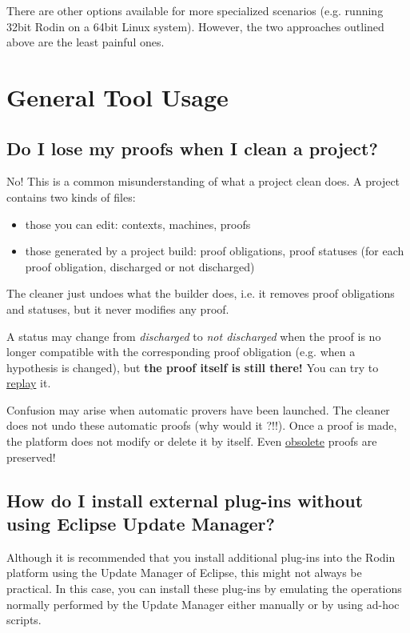 There are other options available for more specialized scenarios (e.g. running 32bit Rodin on a 64bit Linux system).  However, the two approaches outlined above are the least painful ones.

\section{General Tool Usage}

\subsection{Do I lose my proofs when I clean a project?}
No! This is a common misunderstanding of what a project clean does. A project contains two kinds of files: 

\begin{itemize}
	\item those you can edit: contexts, machines, proofs 
	\item those generated by a project build: proof obligations, proof statuses (for each proof obligation, discharged or not discharged) 
\end{itemize}

The cleaner just undoes what the builder does, i.e. it removes proof obligations and statuses, but it never modifies any proof.

A status may change from \emph{discharged} to \emph{not discharged} when the proof is no longer compatible with the corresponding proof obligation (e.g. when a hypothesis is changed), but \textbf{the proof itself is still there!}
You can try to \href{http://wiki.event-b.org/index.php/Proof_Obligation_Commands#Proof_Replay_on_Undischarged_POs}{replay} it.

Confusion may arise when automatic provers have been launched. The cleaner does not undo these automatic proofs (why would it ?!!). Once a proof is made, the platform does not modify or delete it by itself. Even \href{http://wiki.event-b.org/index.php/Proof_Purger_Interface#Why_proofs_become_obsolete}{obsolete} proofs are preserved!

\subsection{How do I install external plug-ins without using Eclipse Update Manager?}

Although it is recommended that you install additional plug-ins into the Rodin platform using the Update Manager of Eclipse, this might not always be practical. In this case, you can install these plug-ins by emulating the operations normally performed by the Update Manager either manually or by using ad-hoc scripts. 


